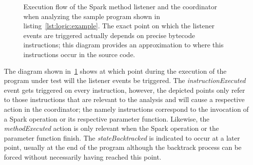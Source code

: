 \begin{figure}[t]
	\caption[Execution flow of the Spark Method Listener and Coordinator]{Execution flow of the Spark method listener and the coordinator when analyzing the sample program shown in listing~\ref{lst:logic:example}. The exact point on which the listener events are triggered actually depends on precise bytecode instructions; this diagram provides an approximation to where this instructions occur in the source code.}
	\label{fig:listener:flow-diagram}
\end{figure}

The diagram shown in~\ref{fig:listener:flow-diagram} shows at which point during the execution of the program under test will the listener events be triggered. The \textit{instructionExecuted} event gets triggered on every instruction, however, the depicted points only refer to those instructions that are relevant to the analysis and will cause a respective action in the coordinator; the namely instructions correspond to the invocation of a Spark operation or its respective parameter function. Likewise, the \textit{methodExecuted} action is only relevant when the Spark operation or the parameter function finish. The \textit{stateBacktracked} is indicated to occur at a later point, usually at the end of the program although the backtrack process can be forced without necessarily having reached this point.